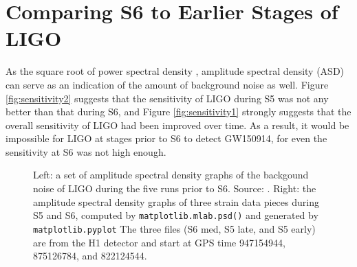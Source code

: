 \documentclass[aps,prd,preprint]{revtex4}
\begin{document}
\section{Comparing S6 to Earlier Stages of LIGO \label{sec:compare}}
As the square root of power spectral density \cite{PSD}, amplitude spectral density (ASD) can serve as an indication of the amount of background noise as well. Figure \ref{fig:sensitivity2} suggests that the sensitivity of LIGO during S5 was not any better than that during S6, and Figure \ref{fig:sensitivity1} strongly suggests that the overall sensitivity of LIGO had been improved over time. As a result, it would be impossible for LIGO at stages prior to S6 to detect GW150914, for even the sensitivity at S6 was not high enough.
\begin{figure}
	\caption{Left: a set of amplitude spectral density graphs of the backgound noise of LIGO during the five runs prior to S6. Source: \cite{nasa}. Right: the amplitude spectral density graphs of three strain data pieces during S5 and S6, computed by \texttt{matplotlib.mlab.psd()} and generated by \texttt{matplotlib.pyplot} The three files (S6 med, S5 late, and S5 early) are from the H1 detector and start at GPS time 947154944, 875126784, and 822124544.}
\end{figure}
\end{document}
